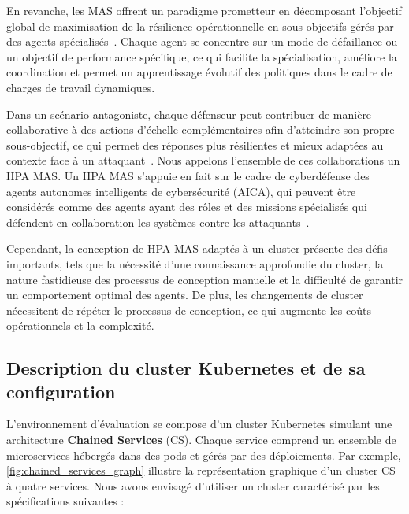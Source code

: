 En revanche, les MAS offrent un paradigme prometteur en décomposant l'objectif global de maximisation de la résilience opérationnelle en sous-objectifs gérés par des agents spécialisés~\cite{Shoham2009MAS}. Chaque agent se concentre sur un mode de défaillance ou un objectif de performance spécifique, ce qui facilite la spécialisation, améliore la coordination et permet un apprentissage évolutif des politiques dans le cadre de charges de travail dynamiques.

Dans un scénario antagoniste, chaque défenseur peut contribuer de manière collaborative à des actions d'échelle complémentaires afin d'atteindre son propre sous-objectif, ce qui permet des réponses plus résilientes et mieux adaptées au contexte face à un attaquant~\cite{Jennings1998}. Nous appelons l'ensemble de ces collaborations un HPA MAS. Un HPA MAS s'appuie en fait sur le cadre de cyberdéfense des agents autonomes intelligents de cybersécurité (AICA), qui peuvent être considérés comme des agents ayant des rôles et des missions spécialisés qui défendent en collaboration les systèmes contre les attaquants~\cite{Kott2018}.

Cependant, la conception de HPA MAS adaptés à un cluster présente des défis importants, tels que la nécessité d'une connaissance approfondie du cluster, la nature fastidieuse des processus de conception manuelle et la difficulté de garantir un comportement optimal des agents. De plus, les changements de cluster nécessitent de répéter le processus de conception, ce qui augmente les coûts opérationnels et la complexité.


\subsection{Description du cluster Kubernetes et de sa configuration}

L'environnement d'évaluation se compose d'un cluster Kubernetes simulant une architecture \textbf{Chained Services} (CS). Chaque service comprend un ensemble de microservices hébergés dans des pods et gérés par des déploiements. Par exemple, \autoref{fig:chained_services_graph} illustre la représentation graphique d'un cluster CS à quatre services. Nous avons envisagé d'utiliser un cluster caractérisé par les spécifications suivantes :

